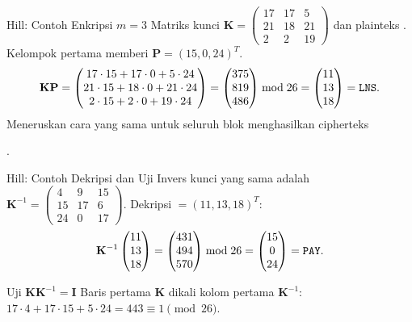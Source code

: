 \documentclass[aspectratio=169,11pt]{beamer}
\begin{document}
\begin{frame}{Hill: Contoh Enkripsi $m=3$}
    \footnotesize
    Matriks kunci
    $\mathbf{K}=\begin{pmatrix}17&17&5\\21&18&21\\2&2&19\end{pmatrix}$
    dan plainteks . Kelompok pertama  memberi
    $\mathbf{P}=(15,0,24)^T$.
    \[
        \mathbf{KP}=
        \begin{pmatrix}
            17\cdot15+17\cdot0+5\cdot24\\
            21\cdot15+18\cdot0+21\cdot24\\
            2\cdot15+2\cdot0+19\cdot24
        \end{pmatrix}
        =
        \begin{pmatrix}375\\819\\486\end{pmatrix}
        \bmod 26
        =
        \begin{pmatrix}11\\13\\18\end{pmatrix}
        =\text{\texttt{LNS}}.
    \]
    Meneruskan cara yang sama untuk seluruh blok menghasilkan cipherteks
    \begin{center}
        .
    \end{center}
\end{frame}

\begin{frame}{Hill: Contoh Dekripsi dan Uji}
    \footnotesize
    Invers kunci yang sama adalah
    $\mathbf{K}^{-1}=
    \begin{pmatrix}4&9&15\\15&17&6\\24&0&17\end{pmatrix}$.
    Dekripsi $=(11,13,18)^T$:
    \[
        \mathbf{K}^{-1}
        \begin{pmatrix}11\\13\\18\end{pmatrix}
        =
        \begin{pmatrix}431\\494\\570\end{pmatrix}
        \bmod 26
        =
        \begin{pmatrix}15\\0\\24\end{pmatrix}
        =\text{\texttt{PAY}}.
    \]
    \begin{block}{Uji $\mathbf{KK}^{-1}=\mathbf{I}$}
        \footnotesize
        Baris pertama $\mathbf{K}$ dikali kolom pertama $\mathbf{K}^{-1}$:
        $17\cdot4+17\cdot15+5\cdot24=443\equiv1\pmod{26}$.
    \end{block}
\end{frame}
\end{document}
